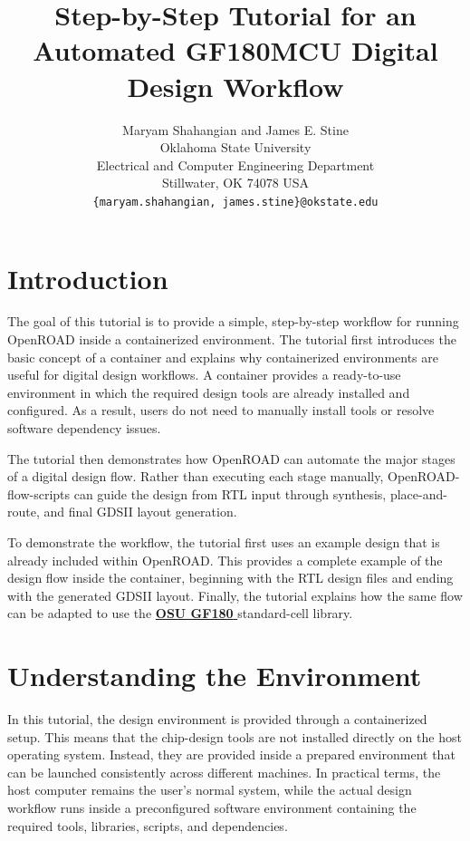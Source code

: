 \documentclass[11pt]{article}
\title{Step-by-Step Tutorial for an Automated GF180MCU Digital Design Workflow}
\author{Maryam Shahangian and James E. Stine \\
        Oklahoma State University\\
        Electrical and Computer Engineering Department\\
        Stillwater, OK 74078 USA\\
        \texttt{\{maryam.shahangian, james.stine\}@okstate.edu}}
\date{}
\begin{document}
\maketitle

\section{Introduction}

The goal of this tutorial is to provide a simple, step-by-step workflow for running OpenROAD inside a containerized environment. The tutorial first introduces the basic concept of a container and explains why containerized environments are useful for digital design workflows. A container provides a ready-to-use environment in which the required design tools are already installed and configured. As a result, users do not need to manually install tools or resolve software dependency issues.

The tutorial then demonstrates how OpenROAD can automate the major stages of a digital design flow. Rather than executing each stage manually, OpenROAD-flow-scripts can guide the design from RTL input through synthesis, place-and-route, and final GDSII layout generation.

To demonstrate the workflow, the tutorial first uses an example design that is already included within OpenROAD. This provides a complete example of the design flow inside the container, beginning with the RTL design files and ending with the generated GDSII layout. Finally, the tutorial explains how the same flow can be adapted to use the
\href{https://github.com/stineje/globalfoundries-pdk-libs-gf180mcu_osu_sc}{
\textcolor{blue!70!black}{\textbf{OSU GF180}}
}
standard-cell library.

\section{Understanding the Environment}

In this tutorial, the design environment is provided through a containerized setup. This means that the chip-design tools are not installed directly on the host operating system. Instead, they are provided inside a prepared environment that can be launched consistently across different machines.
In practical terms, the host computer remains the user's normal system, while the actual design workflow runs inside a preconfigured software environment containing the required tools, libraries, scripts, and dependencies.
\end{document}

